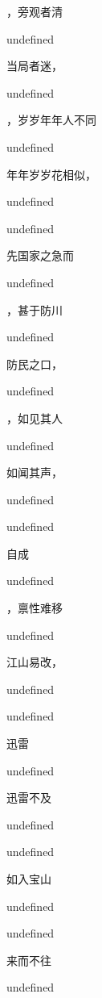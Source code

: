 \documentclass[12pt, a4paper, addpoints]{exam}
\begin{document}
\begin{multicols}{2}
\begin{questions}
\question[2] \fillin，旁观者清

undefined

\question[2] 当局者迷，\fillin

undefined

\question[2] \fillin，岁岁年年人不同

undefined

\question[2] 年年岁岁花相似，\fillin

undefined

\question[2] 

undefined

\question[2] 先国家之急而\fillin

undefined

\question[2] \fillin，甚于防川

undefined

\question[2] 防民之口，\fillin

undefined

\question[2] \fillin，如见其人

undefined

\question[2] 如闻其声，\fillin

undefined

\question[2] 

undefined

\question[2] 自成\fillin

undefined

\question[2] \fillin，禀性难移

undefined

\question[2] 江山易改，\fillin

undefined

\question[2] 

undefined

\question[2] 迅雷

undefined

\question[2] 迅雷不及\fillin

undefined

\question[2] 

undefined

\question[2] 如入宝山\fillin

undefined

\question[2] 

undefined

\question[2] 来而不往\fillin

undefined

\question[2] 


\end{questions}
\end{multicols}
\end{document}
